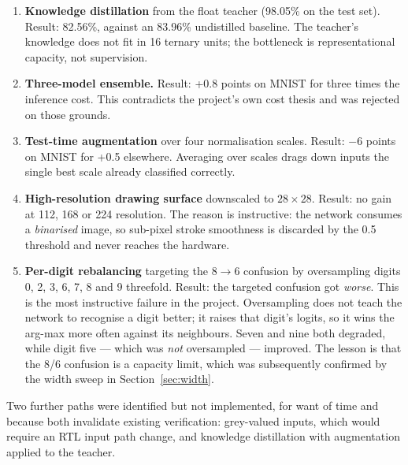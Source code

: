 \documentclass[11pt,a4paper]{article}
\begin{document}
\begin{enumerate}[leftmargin=*]
\item \textbf{Knowledge distillation} from the float teacher (98.05\% on the test
      set). Result: 82.56\%, against an 83.96\% undistilled baseline. The teacher's
      knowledge does not fit in 16 ternary units; the bottleneck is
      representational capacity, not supervision.

\item \textbf{Three-model ensemble.} Result: +0.8 points on MNIST for three
      times the inference cost. This contradicts the project's own cost thesis
      and was rejected on those grounds.

\item \textbf{Test-time augmentation} over four normalisation scales. Result:
      $-$6 points on MNIST for +0.5 elsewhere. Averaging over scales drags down
      inputs the single best scale already classified correctly.

\item \textbf{High-resolution drawing surface} downscaled to $28 \times 28$.
      Result: no gain at 112, 168 or 224 resolution. The reason is instructive:
      the network consumes a \emph{binarised} image, so sub-pixel stroke
      smoothness is discarded by the 0.5 threshold and never reaches the
      hardware.

\item \textbf{Per-digit rebalancing} targeting the $8 \rightarrow 6$ confusion by
      oversampling digits 0, 2, 3, 6, 7, 8 and 9 threefold. Result: the targeted
      confusion got \emph{worse}. This is the most instructive failure
      in the project. Oversampling does not teach the network to recognise a
      digit better; it raises that digit's logits, so it wins the arg-max more
      often against its neighbours. Seven and nine both degraded, while digit
      five --- which was \emph{not} oversampled --- improved. The lesson is that
      the $8$/$6$ confusion is a capacity limit, which was subsequently confirmed
      by the width sweep in Section~\ref{sec:width}.
\end{enumerate}

Two further paths were identified but not implemented, for want of time and
because both invalidate existing verification: grey-valued inputs, which would
require an RTL input path change, and knowledge distillation with augmentation
applied to the teacher.

\end{document}
